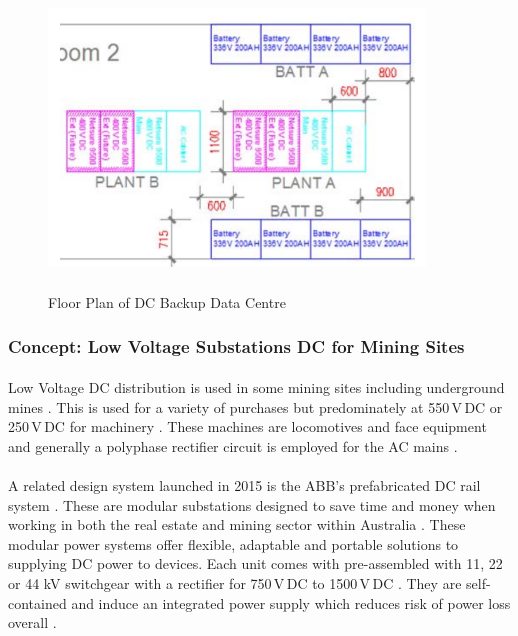 \begin{figure}[H]
\hfill\includegraphics[width = 100mm, height = 80mm]{images/DC_Centre}\hspace*{\fill}
\caption{{Floor Plan of DC Backup Data Centre \cite{Lisy2015}}}
\label{fig:DC_Centre}
\end{figure} 

\newpage

\subsubsection{Concept: Low Voltage Substations DC for Mining Sites}

\paragraph{}
Low Voltage DC distribution is used in some mining sites including underground mines \cite{Morley1990}. This is used for a variety of purchases but predominately at 550\,V\,DC or 250\,V\,DC for machinery \cite{Morley1990}. These machines are locomotives and face equipment and generally a polyphase rectifier circuit is employed for the AC mains \cite{Morley1990}.

\paragraph{}
A related design system launched in 2015 is the ABB's prefabricated DC rail system \cite{website:ProQuest1}. These are modular substations designed to save time and money when working in both the real estate and mining sector within Australia \cite{website:ProQuest1}. These modular power systems offer flexible, adaptable and portable solutions to supplying DC power to devices. Each unit comes with pre-assembled with 11, 22 or 44 kV switchgear with a rectifier for 750\,V\,DC to 1500\,V\,DC \cite{website:ProQuest1}. They are self-contained and induce an integrated power supply which reduces risk of power loss overall \cite{website:ProQuest1}.            

